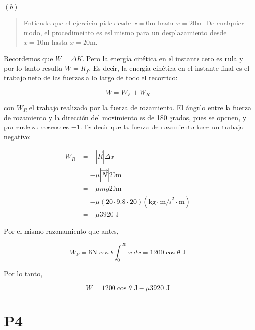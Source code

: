 \documentclass[12pt]{article}
\theoremstyle{definition}
\begin{document}
$(b)$


\small
\begin{quote}

Entiendo que el ejercicio pide desde $x = 0\text{m}$ hasta $x=20\text{m}$. De
cualquier modo, el procedimeinto es esl mismo para un desplazamiento desde 
$x = 10\text{m}$ hasta $x=20$m.

\end{quote}
\normalsize


Recordemos que $W = \Delta K$. Pero la energía cinética en el instante
cero es nula y por lo tanto resulta $W = K_f$. Es decir, la energía cinética en
el instante final es el trabajo neto de las fuerzas a lo largo de todo el
recorrido: 

\begin{equation*}
    W = W_F + W_R
\end{equation*}

con $W_R$ el trabajo realizado por la fuerza de rozamiento. El ángulo entre la
fuerza de rozamiento y la dirección del movimiento es de 180 grados, pues se
oponen, y por ende su coseno es $-1$. Es decir que la fuerza de rozamiento hace un trabajo
negativo:

\begin{align*}
    W_R 
    &= -\left| \vec{R} \right| \Delta x \\ 
    &= - \mu\left| \vec{N} \right| 20\text{m} \\ 
    &= - \mu mg 20\text{m} \\ 
    &= - \mu (20 \cdot 9.8 \cdot 20) (\text{kg} \cdot \text{m/s}^2 \cdot
    \text{m}) \\ 
    &= -\mu 3920 \text{ J}
\end{align*}

Por el mismo razonamiento que antes, 

\begin{equation*}
    W_F = 6\text{N} \cos \theta\int_{0}^{20} x ~ dx = 1200 \cos \theta \text{ J}
\end{equation*}

Por lo tanto, 

\begin{equation*}
    W = 1200 \cos \theta \text{ J} - \mu 3920 \text{ J}
\end{equation*}

\pagebreak 

\section{P4}
\end{document}
